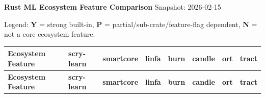 \documentclass[10pt]{article}
\begin{document}
\small
\textbf{Rust ML Ecosystem Feature Comparison} \hfill Snapshot: 2026-02-15

\vspace{0.4em}
Legend: \textbf{Y} = strong built-in, \textbf{P} = partial/sub-crate/feature-flag dependent, \textbf{N} = not a core ecosystem feature.

\vspace{0.4em}
\scriptsize
\begin{longtable}{
  p{2.70in}
  p{0.80in}
  p{0.80in}
  p{0.80in}
  p{0.80in}
  p{0.80in}
  p{0.80in}
  p{0.80in}
}
\toprule
\textbf{Ecosystem Feature} & \textbf{scry-learn} & \textbf{smartcore} & \textbf{linfa} & \textbf{burn} & \textbf{candle} & \textbf{ort} & \textbf{tract} \\
\midrule
\endfirsthead
\toprule
\textbf{Ecosystem Feature} & \textbf{scry-learn} & \textbf{smartcore} & \textbf{linfa} & \textbf{burn} & \textbf{candle} & \textbf{ort} & \textbf{tract} \\
\midrule
\endhead


\end{longtable}
\end{document}
